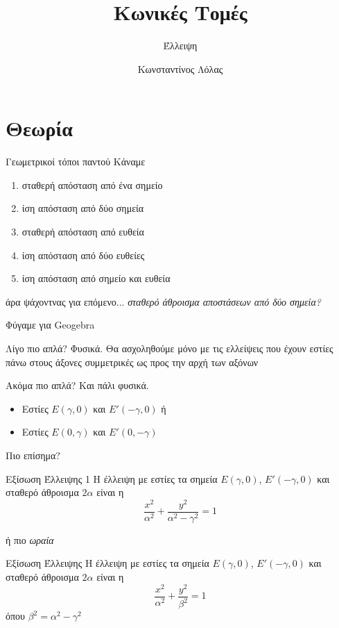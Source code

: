 \documentclass{presentation}
\title{Κωνικές Τομές}
\subtitle{Έλλειψη}
\author[Λόλας]{Κωνσταντίνος Λόλας}
\date{}
\begin{document}
\begin{frame}
  \titlepage
\end{frame}

\section{Θεωρία}
\begin{frame}{Γεωμετρικοί τόποι παντού}
  Κάναμε
  \begin{enumerate}
    \item<1-> σταθερή απόσταση από ένα σημείο
    \item<2-> ίση απόσταση από δύο σημεία
    \item<3-> σταθερή απόσταση από ευθεία
    \item<4-> ίση απόσταση από δύο ευθείες
    \item<5-> ίση απόσταση από σημείο και ευθεία
  \end{enumerate}
   {άρα ψάχοντνας για επόμενο...}  {\emph{σταθερό άθροισμα αποστάσεων από δύο σημεία?}}
\end{frame}

\begin{frame}{Φύγαμε για Geogebra}
  \href{https://www.geogebra.org/classic/wfmc8s24}{}
\end{frame}

\begin{frame}{Λίγο πιο απλά?}
  Φυσικά. Θα ασχοληθούμε μόνο με τις ελλείψεις που έχουν εστίες πάνω στους άξονες συμμετρικές ως προς την αρχή των αξόνων
\end{frame}

\begin{frame}{Ακόμα πιο απλά?}
  Και πάλι φυσικά.
  \begin{itemize}
    \item Εστίες $Ε(γ,0)$ και $Ε'(-γ,0)$ ή
    \item Εστίες $Ε(0,γ)$ και $Ε'(0,-γ)$
  \end{itemize}
\end{frame}

\begin{frame}[label=Έλλειψη]{Πιο επίσημα?}
  \begin{block}{Εξίσωση Έλλειψης 1}
    Η έλλειψη με εστίες τα σημεία $Ε(γ,0)$, $Ε'(-γ,0)$ και σταθερό άθροισμα $2α$ είναι η
    $$\dfrac{x^2}{α^2}+\dfrac{y^2}{α^2-γ^2}=1$$
  \end{block}
  ή πιο \emph{ωραία}
  \begin{block}{Εξίσωση Έλλειψης}
    Η έλλειψη με εστίες τα σημεία $Ε(γ,0)$, $Ε'(-γ,0)$ και σταθερό άθροισμα $2α$ είναι η
    $$\dfrac{x^2}{α^2}+\dfrac{y^2}{β^2}=1$$
    όπου $β^2=α^2-γ^2$
  \end{block}

  \hyperlink{ΑπόδειξηΕξίσωσης}{}

\end{frame}
\end{document}
